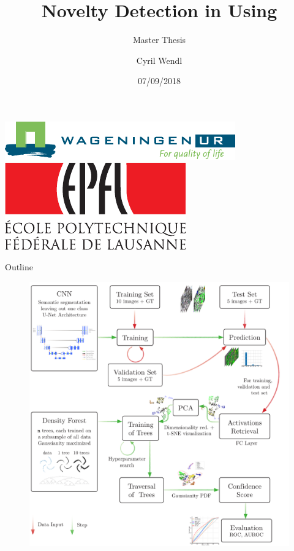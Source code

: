 \documentclass[xcolor={usenames,dvipsnames}]{beamer}
\title[Novelty Detection in CNNs]{Novelty Detection in \acrlongpl{CNN} Using \acrlongpl{DF}
}
\subtitle{Master Thesis}
\author{Cyril Wendl}
\institute[EPFL] 
{
	Environmental Sciences and Engineering\\
	EPFL
}
\date[07/09/2018]{07/09/2018}
\begin{document}
\begin{frame}
		\centering\includegraphics[height=.6cm]{logo_wur_quality_of_life}\hspace{.5cm}\includegraphics[height=.6cm]{logo}
		\titlepage
	\end{frame}
	\begin{frame}{Outline}
		 \vspace*{-1.2cm}
	\begin{figure}
		\centering
	    \hspace{2cm}\includegraphics[height=.95\textheight]{../Report/Schema/schema_df}
	\end{figure}
	\end{frame}
\end{document}

